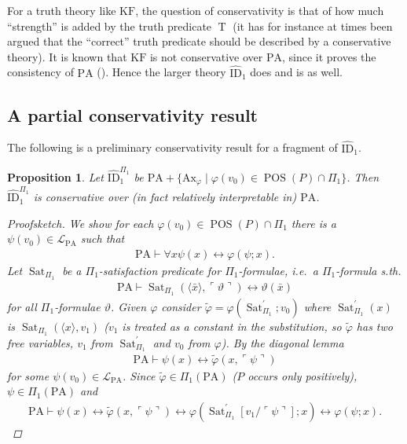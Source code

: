 \documentclass{scrartcl}
\theoremstyle{definition}
\theoremstyle{plain}
\newtheorem{Prp}{Proposition}
\theoremstyle{remark}
\DeclareMathOperator{\T}{T}
\newcommand{\liff}{\leftrightarrow}
\renewcommand{\=}{=\!\!\!=}
\newcommand{\GN}[1]{\ensuremath{\ulcorner #1 \urcorner}}
\newcommand{\sep}{\; | \;}
\newcommand{\PA}{\ensuremath{\mathrm{PA}}}
\renewcommand{\L}{\ensuremath{\mathcal{L}}}
\DeclareMathOperator{\Sat}{Sat}
\DeclareMathOperator{\POS}{POS}
\newcommand{\ID}[2][]{\ensuremath{\widehat{\mathrm{ID}}_{#2}^{#1}}}
\newcommand{\KF}{\ensuremath{\mathrm{KF}}}
\newcommand{\Ax}{\ensuremath{\mathrm{Ax}}}
\begin{document}
For a truth theory like $\KF$, the question of conservativity is that of how much ``strength'' is added by the truth predicate $\T$ (it has for instance at times been argued that the ``correct'' truth predicate should be described by a conservative theory). It is known that $\KF$ is not conservative over $\PA$, since it proves the consistency of $\PA$ (\cite[pp.~106, 159 \& 217]{Halbach:2011}). Hence the larger theory $\ID1$ does and is as well.

\subsection{A partial conservativity result}
\label{sec:partial}

The following is a preliminary conservativity result for a fragment of $\ID1$.

\begin{Prp}\label{prp:clc}
  Let $\ID[\Pi_1]1$ be  $\PA + \{\Ax_{\varphi} \sep \varphi(v_0) \in \POS(P) \cap \Pi_1\}$. Then $\ID[\Pi_1]1$ is conservative over (in fact relatively interpretable in) $\PA$.
  \begin{proof}[Proofsketch]
    We show for each $\varphi(v_0) \in \POS(P) \cap \Pi_1$ there is a $\psi(v_0) \in \L_{\PA}$ such that
    \begin{align*}
      \PA \vdash \forall x \psi(x) \liff \varphi(\psi;x)\text{.}
    \end{align*}
    Let $\Sat_{\Pi_1}$ be a $\Pi_1$-satisfaction predicate for $\Pi_1$-formulae, i.e.~a $\Pi_1$-formula s.th.
    \begin{align*}
      \PA \vdash \Sat_{\Pi_1}(\langle \bar{x} \rangle, \GN{\vartheta}) \liff \vartheta(\bar{x})
    \end{align*}
    for all $\Pi_1$-formulae $\vartheta$. Given $\varphi$ consider $\tilde{\varphi} = \varphi(\Sat_{\Pi_1}^{\prime};v_0)$ where $\Sat_{\Pi_1}^{\prime}(x)$ is $\Sat_{\Pi_1}(\langle x \rangle,v_1)$ ($v_1$ is treated as a constant in the substitution, so $\tilde{\varphi}$ has two free variables, $v_1$ from $\Sat_{\Pi_1}^{\prime}$ and $v_0$ from $\varphi$). By the diagonal lemma
    \begin{align*}
      \PA \vdash \psi(x) \liff \tilde{\varphi}(x,\GN{\psi})
    \end{align*}
    for some $\psi(v_0) \in \L_{\PA}$. Since $\tilde{\varphi} \in \Pi_1(\PA)$ ($P$ occurs only positively), $\psi \in \Pi_1(\PA)$ and
    \begin{align*}
      \PA \vdash \psi(x) \liff \tilde{\varphi}(x,\GN{\psi}) \liff \varphi(\Sat_{\Pi_1}^{\prime}[v_1/\GN{\psi}];x) \liff \varphi(\psi;x)\text{.}
    \end{align*}
  \end{proof}
\end{Prp}
\end{document}
